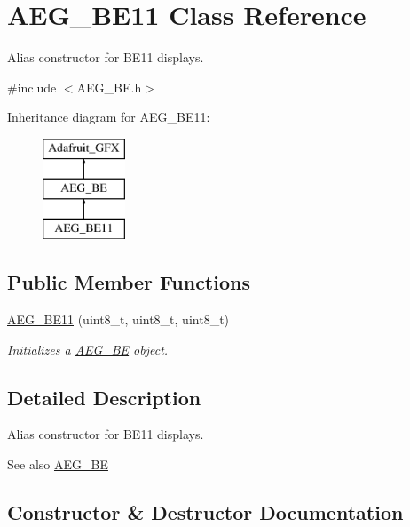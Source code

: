 \hypertarget{class_a_e_g___b_e11}{}\section{A\+E\+G\+\_\+\+B\+E11 Class Reference}
\label{class_a_e_g___b_e11}


Alias constructor for B\+E11 displays.  




{\ttfamily \#include $<$A\+E\+G\+\_\+\+B\+E.\+h$>$}

Inheritance diagram for A\+E\+G\+\_\+\+B\+E11\+:\begin{figure}[H]
\begin{center}
\leavevmode
\includegraphics[height=3.000000cm]{class_a_e_g___b_e11}
\end{center}
\end{figure}
\subsection*{Public Member Functions}
\begin{DoxyCompactItemize}
\item 
\hyperlink{class_a_e_g___b_e11_addb3a2e7c180491a65374fdef38f67da}{A\+E\+G\+\_\+\+B\+E11} (uint8\+\_\+t, uint8\+\_\+t, uint8\+\_\+t)
\begin{DoxyCompactList}\small\item\em Initializes a {\ttfamily \hyperlink{class_a_e_g___b_e}{A\+E\+G\+\_\+\+BE}} object. \end{DoxyCompactList}\end{DoxyCompactItemize}


\subsection{Detailed Description}
Alias constructor for B\+E11 displays. 

\begin{DoxySeeAlso}{See also}
\hyperlink{class_a_e_g___b_e}{A\+E\+G\+\_\+\+BE} 
\end{DoxySeeAlso}


\subsection{Constructor \& Destructor Documentation}
\mbox{\label{class_a_e_g___b_e11_addb3a2e7c180491a65374fdef38f67da}} 
